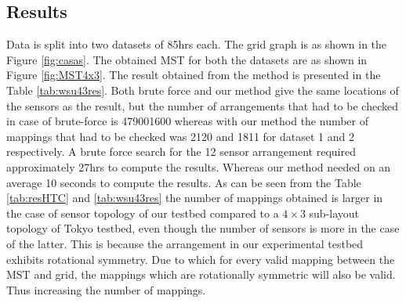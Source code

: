 \subsection{Results}
Data is split into two datasets of 85hrs each. The grid graph is as shown in the Figure \ref{fig:casas}. The obtained MST for both the datasets are as shown in Figure \ref{fig:MST4x3}. The result obtained from the method is presented in the Table \ref{tab:wsu43res}. Both brute force and our method give the same locations of the sensors as the result, but the number of arrangements that had to be checked in case of brute-force is 479001600 whereas with our method the number of mappings that had to be checked was 2120 and 1811 for dataset 1 and 2 respectively. A brute force search for the 12 sensor arrangement required approximately 27hrs to compute the results. Whereas our method needed on an average 10 seconds to compute the results. As can be seen from the Table \ref{tab:resHTC} and \ref{tab:wsu43res} the number of mappings obtained is larger in the case of sensor topology of our testbed compared to a $4 \times 3$ sub-layout topology of Tokyo testbed, even though the number of sensors is more in the case of the latter. This is because the arrangement in our experimental testbed exhibits rotational symmetry. Due to which for every valid mapping between the MST and grid, the mappings which are rotationally symmetric will also be valid. Thus increasing the number of mappings.
